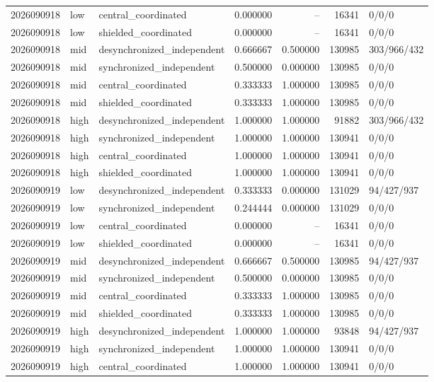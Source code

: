 \begin{longtable}{llp{38mm}rrrp{30mm}}
2026090918 & low & central\_coordinated & 0.000000 & -- & 16341 & 0/0/0 \\
2026090918 & low & shielded\_coordinated & 0.000000 & -- & 16341 & 0/0/0 \\
2026090918 & mid & desynchronized\_independent & 0.666667 & 0.500000 & 130985 & 303/966/432 \\
2026090918 & mid & synchronized\_independent & 0.500000 & 0.000000 & 130985 & 0/0/0 \\
2026090918 & mid & central\_coordinated & 0.333333 & 1.000000 & 130985 & 0/0/0 \\
2026090918 & mid & shielded\_coordinated & 0.333333 & 1.000000 & 130985 & 0/0/0 \\
2026090918 & high & desynchronized\_independent & 1.000000 & 1.000000 & 91882 & 303/966/432 \\
2026090918 & high & synchronized\_independent & 1.000000 & 1.000000 & 130941 & 0/0/0 \\
2026090918 & high & central\_coordinated & 1.000000 & 1.000000 & 130941 & 0/0/0 \\
2026090918 & high & shielded\_coordinated & 1.000000 & 1.000000 & 130941 & 0/0/0 \\
2026090919 & low & desynchronized\_independent & 0.333333 & 0.000000 & 131029 & 94/427/937 \\
2026090919 & low & synchronized\_independent & 0.244444 & 0.000000 & 131029 & 0/0/0 \\
2026090919 & low & central\_coordinated & 0.000000 & -- & 16341 & 0/0/0 \\
2026090919 & low & shielded\_coordinated & 0.000000 & -- & 16341 & 0/0/0 \\
2026090919 & mid & desynchronized\_independent & 0.666667 & 0.500000 & 130985 & 94/427/937 \\
2026090919 & mid & synchronized\_independent & 0.500000 & 0.000000 & 130985 & 0/0/0 \\
2026090919 & mid & central\_coordinated & 0.333333 & 1.000000 & 130985 & 0/0/0 \\
2026090919 & mid & shielded\_coordinated & 0.333333 & 1.000000 & 130985 & 0/0/0 \\
2026090919 & high & desynchronized\_independent & 1.000000 & 1.000000 & 93848 & 94/427/937 \\
2026090919 & high & synchronized\_independent & 1.000000 & 1.000000 & 130941 & 0/0/0 \\
2026090919 & high & central\_coordinated & 1.000000 & 1.000000 & 130941 & 0/0/0 \\

\end{longtable}

